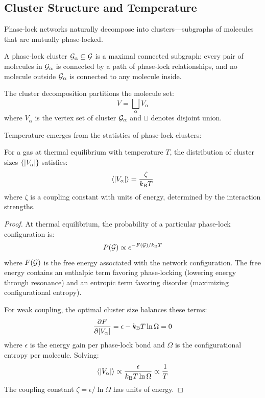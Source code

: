 \subsection{Cluster Structure and Temperature}

Phase-lock networks naturally decompose into clusters---subgraphs of molecules that are mutually phase-locked.

\begin{definition}
\label{def:cluster}
A phase-lock cluster $\mathcal{G}_\alpha \subseteq \mathcal{G}$ is a maximal connected subgraph: every pair of molecules in $\mathcal{G}_\alpha$ is connected by a path of phase-lock relationships, and no molecule outside $\mathcal{G}_\alpha$ is connected to any molecule inside.
\end{definition}

The cluster decomposition partitions the molecule set:
\begin{equation}
V = \bigsqcup_\alpha V_\alpha
\label{eq:partition}
\end{equation}
where $V_\alpha$ is the vertex set of cluster $\mathcal{G}_\alpha$ and $\sqcup$ denotes disjoint union.

Temperature emerges from the statistics of phase-lock clusters:

\begin{proposition}
\label{prop:temperature_cluster}
For a gas at thermal equilibrium with temperature $T$, the distribution of cluster sizes $\{|V_\alpha|\}$ satisfies:
\begin{equation}
\langle |V_\alpha| \rangle = \frac{\zeta}{k_{\mathrm{B}} T}
\label{eq:cluster_size}
\end{equation}
where $\zeta$ is a coupling constant with units of energy, determined by the interaction strengths.
\end{proposition}

\begin{proof}
At thermal equilibrium, the probability of a particular phase-lock configuration is:
\begin{equation}
P(\mathcal{G}) \propto e^{-F(\mathcal{G})/k_{\mathrm{B}} T}
\end{equation}
where $F(\mathcal{G})$ is the free energy associated with the network configuration. The free energy contains an enthalpic term favoring phase-locking (lowering energy through resonance) and an entropic term favoring disorder (maximizing configurational entropy).

For weak coupling, the optimal cluster size balances these terms:
\begin{equation}
\frac{\partial F}{\partial |V_\alpha|} = \epsilon - k_{\mathrm{B}} T \ln\Omega = 0
\end{equation}
where $\epsilon$ is the energy gain per phase-lock bond and $\Omega$ is the configurational entropy per molecule. Solving:
\begin{equation}
\langle |V_\alpha| \rangle \propto \frac{\epsilon}{k_{\mathrm{B}} T \ln\Omega} \propto \frac{1}{T}
\end{equation}
The coupling constant $\zeta = \epsilon/\ln\Omega$ has units of energy.
\end{proof}


